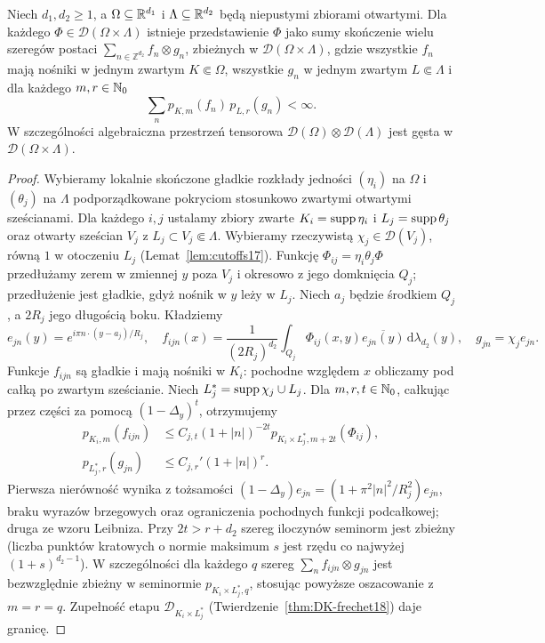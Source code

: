 \begin{lemat}
\label{lem:tensor-density23}
Niech $d_1,d_2\ge1$, a $\Omega\subseteq\mathbb R^{d_1}$ i
$\Lambda\subseteq\mathbb R^{d_2}$ będą niepustymi zbiorami otwartymi.
Dla każdego $\Phi\in\mathcal D(\Omega\times\Lambda)$
istnieje przedstawienie $\Phi$ jako sumy skończenie
wielu szeregów postaci
$\sum_{n\in\mathbb Z^{d_2}}f_n\otimes g_n$,
zbieżnych w $\mathcal D(\Omega\times\Lambda)$,
gdzie wszystkie $f_n$ mają nośniki w jednym zwartym
$K\Subset\Omega$, wszystkie $g_n$ w jednym zwartym
$L\Subset\Lambda$ i dla każdego $m,r\in\mathbb N_0$
\[
 \sum_n p_{K,m}(f_n)\,p_{L,r}(g_n)<\infty.
\]
W szczególności algebraiczna przestrzeń tensorowa
$\mathcal D(\Omega)\otimes\mathcal D(\Lambda)$
jest gęsta w $\mathcal D(\Omega\times\Lambda)$.
\end{lemat}
\begin{proof}
Wybieramy lokalnie skończone gładkie rozkłady jedności
$(\eta_i)$ na $\Omega$ i $(\theta_j)$ na $\Lambda$
podporządkowane pokryciom stosunkowo zwartymi otwartymi
sześcianami. Dla każdego $i,j$ ustalamy zbiory zwarte
$K_i=\operatorname{supp}\eta_i$ i $L_j=\operatorname{supp}\theta_j$ oraz otwarty
sześcian $V_j$ z $L_j\subset V_j\Subset\Lambda$.
Wybieramy rzeczywistą $\chi_j\in\mathcal D(V_j)$,
równą $1$ w otoczeniu $L_j$ (Lemat~\ref{lem:cutoffs17}).
Funkcję $\Phi_{ij}=\eta_i\theta_j\Phi$ przedłużamy
zerem w zmiennej $y$ poza $V_j$ i okresowo z jego
domknięcia $Q_j$; przedłużenie jest gładkie,
gdyż nośnik w $y$ leży w $L_j$.
Niech $a_j$ będzie środkiem $Q_j$, a $2R_j$ jego
długością boku. Kładziemy
\[
 e_{jn}(y)=e^{i\pi n\cdot(y-a_j)/R_j},
 \quad
 f_{ijn}(x)=\frac{1}{(2R_j)^{d_2}}
 \int_{Q_j}\Phi_{ij}(x,y)\overline{e_{jn}(y)}
 \,\mathrm d\lambda_{d_2}(y),
 \quad g_{jn}=\chi_j e_{jn}.
\]
Funkcje $f_{ijn}$ są gładkie i mają nośniki w $K_i$:
pochodne względem $x$ obliczamy pod całką po zwartym
sześcianie. Niech $L_j^*=\operatorname{supp}\chi_j\cup L_j$.
Dla $m,r,t\in\mathbb N_0$, całkując przez części za pomocą
$(1-\Delta_y)^t$, otrzymujemy
\[
 \begin{aligned}
 p_{K_i,m}(f_{ijn})&\le C_{j,t}
 (1+|n|)^{-2t}p_{K_i\times L_j^*,m+2t}(\Phi_{ij}),\\
 p_{L_j^*,r}(g_{jn})&\le C_{j,r}'(1+|n|)^r .
 \end{aligned}
\]
Pierwsza nierówność wynika z tożsamości
$(1-\Delta_y)e_{jn}=(1+\pi^2|n|^2/R_j^2)e_{jn}$,
braku wyrazów brzegowych oraz ograniczenia pochodnych
funkcji podcałkowej; druga ze wzoru Leibniza.
Przy $2t>r+d_2$ szereg iloczynów seminorm jest zbieżny
(liczba punktów kratowych o normie maksimum $s$
jest rzędu co najwyżej $(1+s)^{d_2-1}$).
W szczególności dla każdego $q$ szereg
$\sum_n f_{ijn}\otimes g_{jn}$ jest bezwzględnie
zbieżny w seminormie $p_{K_i\times L_j^*,q}$,
stosując powyższe oszacowanie z $m=r=q$.
Zupełność etapu $\mathcal D_{K_i\times L_j^*}$
(Twierdzenie~\ref{thm:DK-frechet18}) daje granicę.


\end{proof}

